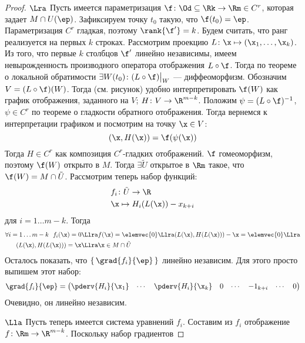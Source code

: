 \begin{proof}
    \enewline
    \item[$\Lra$] Пусть имеется параметризация $\f \colon \Od \subseteq \Rk \to \Rm
    \in C^r$, которая задает $M \cap U(\ep)$. Зафиксируем точку $t_0$ такую, что $\f(t_0) = \ep$.
    Параметризация $C^r$ гладкая, поэтому $\rank{\f'} = k$. Будем считать,
    что ранг реализуется на первых $k$ строках. Рассмотрим проекцию
    $L \colon \x \mapsto (\x_1, \ldots, \x_k)$. Из того, что первые $k$ столбцов
    $\f'$ линейно независимы, имеем невырожденность производного оператора
    отображения $L \circ \f$. Тогда по теореме о локальной обратимости
    $\exists W(t_0) \colon (L \circ \f)\big|_W$ --- диффеоморфизм. Обозначим
    $V = (L \circ \f)(W)$. Тогда (см. рисунок) удобно интерпретировать $\f(W)$ как
    график отображения, заданного на $V$; $H \colon V \to \R^{m - k}$.
    Положим $\psi = (L \circ \f)^{-1}$, $\psi \in C^r$ по теореме о гладкости обратного
    отображения. Тогда вернемся к интерпретации графиком и посмотрим на точку
    $\x \in V$:
\[
    (\x, H(\x)) = \f(\psi(\x))
\]
    Тогда $H \in C^r$ как композиция $C^r$-гладких отображений. $\f$ гомеоморфизм,
    поэтому $\f(W)$ открыто в $M$. Тогда $\exists \tilde{U}$ открытое в $\Rm$
    такое, что $\f(W) = M \cap \tilde{U}$. Рассмотрим теперь набор функций:
\begin{align*}
    &f_i \colon \tilde{U} \to \R \\
    &\x \mapsto H_i(L(\x)) - x_{k + i}
\end{align*}
    для $i = 1\ldots m - k$. Тогда
\begin{align*}
	\forall i = 1\ldots m - k~~ f_i(\x) = 0 &\Llra
	f(\x) = \elemvec{0} \Llra (L(\x), H(L(\x))) - \x = \elemvec{0} \Llra \\
	(L(\x), H(L(\x))) = \x &\Llra \x \in M \cap \tilde{U}
\end{align*}
    Осталось показать, что $\{\,\grad{f_i}{\ep}\,\}$ линейно независим.
    Для этого просто выпишем этот набор:
\begin{align*}
    \grad{f_i}{\ep} =
    \begin{pmatrix}
        \pderv{H_i}{\x_1} &  \cdots & \pderv{H_i}{\x_k} & 0 & \cdots & -1_{k + i} & \cdots & 0
    \end{pmatrix} \\
\end{align*}
    Очевидно, он линейно независим.
    \item[$\Lla$] Пусть теперь имеется система уравнений $f_i$. Составим из
    $f_i$ отображение $f \colon \Rm \to \R^{m - k}$. Поскольку набор градиентов

\end{proof}
